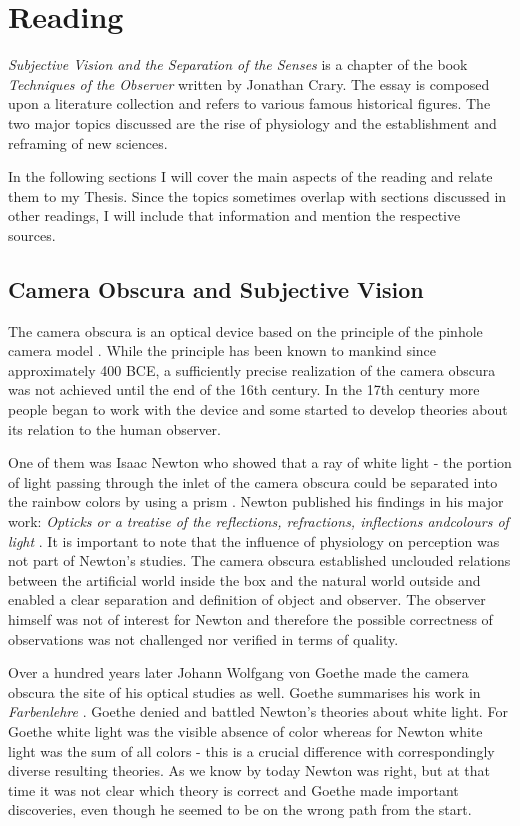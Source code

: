 \documentclass[12pt,a4paper]{article}
\begin{document}
\section*{Reading}

{\it{Subjective Vision and the Separation of the Senses}} is a chapter of the book {\it{Techniques of the
Observer}} \cite{crary} written by Jonathan Crary. The essay is composed upon a literature collection and
refers to various famous historical figures. The two major topics discussed are the rise of physiology and
the establishment and reframing of new sciences.

In the following sections I will cover the main aspects of the reading and relate them to my Thesis.
Since the topics sometimes overlap with sections discussed in other readings, I will include that
information and mention the respective sources.

\subsection*{Camera Obscura and Subjective Vision}

The camera obscura is an optical device based on the principle of the pinhole camera model \cite{camera}. While
the principle has been known to mankind since approximately 400 BCE, a sufficiently precise realization of the
camera obscura was not achieved until the end of the 16th century. In the 17th century more people began to
work with the device and some started to develop theories about its relation to the human observer.

One of them was Isaac Newton who showed that a ray of white light - the portion of light passing through the
inlet of the camera obscura could be separated into the rainbow colors by using a prism \cite{newtongoethe}.
Newton published his findings in his major work: {\it{Opticks or a treatise of the reflections, refractions,
inflections andcolours of light}} \cite{opticks}.
It is important to note that the influence of physiology on perception
was not part of Newton's studies. The camera obscura established unclouded relations between
the artificial world inside the box and the natural world outside and enabled a clear separation
and definition of object and observer. The observer himself was not of interest for Newton and therefore the
possible correctness of observations was not challenged nor verified in terms of quality.

\newpage

Over a hundred years later Johann Wolfgang von Goethe made the camera obscura the site of his optical studies
as well. Goethe summarises his work in {\it{Farbenlehre}} \cite{farbenlehre}. 
Goethe denied and battled Newton's theories about white light. For Goethe white light was the visible
absence of color whereas for Newton white light was the sum of all colors - this is a crucial difference
with correspondingly diverse resulting theories. As we know by today Newton was right, but at that time it
was not clear which theory is correct and Goethe made important discoveries, even though he seemed to be on
the wrong path from the start.
\end{document}
